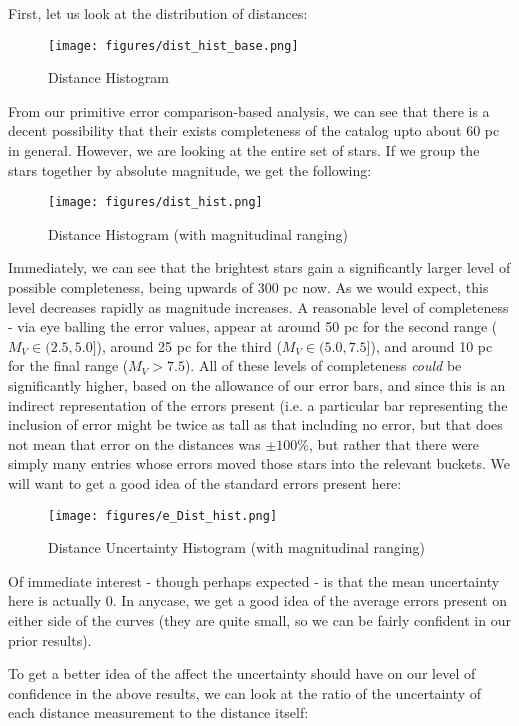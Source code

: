 \documentclass{business-covered} %
\begin{document}
		First, let us look at the distribution of distances:
		\begin{figure}[h!]
			\texttt{[image: figures/dist\_hist\_base.png]}
			\caption{Distance Histogram}
		\end{figure}
		
		From our primitive error comparison-based analysis, we can see that there is a decent possibility that their exists completeness of the catalog upto about 60 pc in general. However, we are looking at the entire set of stars. If we group the stars together by absolute magnitude, we get the following:
		\pagebreak 
		\begin{figure}[h!]
			\texttt{[image: figures/dist\_hist.png]}
			\caption{Distance Histogram (with magnitudinal ranging)}
		\end{figure}
		
		Immediately, we can see that the brightest stars gain a significantly larger level of possible completeness, being upwards of 300 pc now. As we would expect, this level decreases rapidly as magnitude increases. A reasonable level of completeness - via eye balling the error values, appear at around 50 pc for the second range ($M_V \in (2.5,5.0]$), around 25 pc for the third ($M_V \in (5.0,7.5]$), and around 10 pc for the final range ($M_V > 7.5$). All of these levels of completeness \textit{could} be significantly higher, based on the allowance of our error bars, and since this is an indirect representation of the errors present (i.e. a particular bar representing the inclusion of error might be twice as tall as that including no error, but that does not mean that error on the distances was $\pm 100\%$, but rather that there were simply many entries whose errors moved those stars into the relevant buckets. 
\pagebreak		
		We will want to get a good idea of the standard errors present here:	
		
		\begin{figure}[h!]
			\texttt{[image: figures/e\_Dist\_hist.png]}
			\caption{Distance Uncertainty Histogram (with magnitudinal ranging)}
		\end{figure}

		Of immediate interest - though perhaps expected - is that the mean uncertainty here is actually 0. In anycase, we get a good idea of the average errors present on either side of the curves (they are quite small, so we can be fairly confident in our prior results). 
		
\pagebreak		
		To get a better idea of the affect the uncertainty should have on our level of confidence in the above results, we can look at the ratio of the uncertainty of each distance measurement to the distance itself:
		
\end{document}
